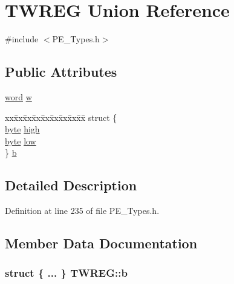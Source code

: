 \hypertarget{union_t_w_r_e_g}{}\section{T\+W\+R\+EG Union Reference}
\label{union_t_w_r_e_g}


{\ttfamily \#include $<$P\+E\+\_\+\+Types.\+h$>$}

\subsection*{Public Attributes}
\begin{DoxyCompactItemize}
\item 
\hyperlink{_p_e___types_8h_abad51e07ab6d26bec9f1f786c8d65bcd}{word} \hyperlink{union_t_w_r_e_g_af5cb5460f8cfc067454f6acec1ba04ac}{w}
\item 
\begin{tabbing}
xx\=xx\=xx\=xx\=xx\=xx\=xx\=xx\=xx\=\kill
struct \{\\
\>\hyperlink{_p_e___types_8h_a0c8186d9b9b7880309c27230bbb5e69d}{byte} \hyperlink{union_t_w_r_e_g_a60da206916b4a23cd33571bf37e66af8}{high}\\
\>\hyperlink{_p_e___types_8h_a0c8186d9b9b7880309c27230bbb5e69d}{byte} \hyperlink{union_t_w_r_e_g_a0ed527e62a851c56d0596429ad250718}{low}\\
\} \hyperlink{union_t_w_r_e_g_a4ed320a95e015a0f5b7dc3fc2ab7ff49}{b}\\

\end{tabbing}\end{DoxyCompactItemize}


\subsection{Detailed Description}


Definition at line 235 of file P\+E\+\_\+\+Types.\+h.



\subsection{Member Data Documentation}
\subsubsection[{\texorpdfstring{b}{b}}]{\setlength{\rightskip}{0pt plus 5cm}struct \{ ... \}   T\+W\+R\+E\+G\+::b}\hypertarget{union_t_w_r_e_g_a4ed320a95e015a0f5b7dc3fc2ab7ff49}{}\label{union_t_w_r_e_g_a4ed320a95e015a0f5b7dc3fc2ab7ff49}
